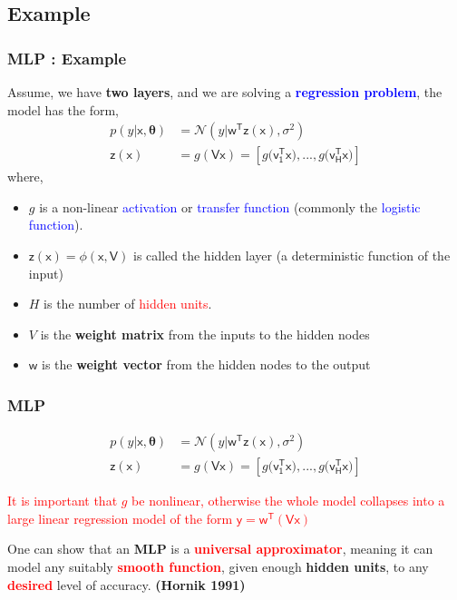 \documentclass{beamer}
\begin{document}
\subsection{Example}
\begin{frame}
    \frametitle{MLP : Example}
	Assume, we have \textbf{two layers}, and we are solving a \textbf{\textcolor{blue}{regression problem}}, the model has the form,
	\begin{align*}
	    p(y|\bm{\mathsf{x},\theta}) &= \mathcal{N}(y|\bm{\mathsf{w^{T}z(x)}},\sigma^{2})\\
	    \bm{\mathsf{z(x)}} &= g(\bm{\mathsf{Vx}}) = [g(\mathsf{v_{1}^{T}x)}, ... ,g(\mathsf{v_{H}^{T}x)}]
	\end{align*}
	where, 
	\begin{itemize}

		\item $g$ is a non-linear \textcolor{blue}{activation} or \textcolor{blue}{transfer function} (commonly the \textcolor{blue}{logistic function}).\\
		\item $\bm{\mathsf{z(x) = \phi(x, V)}}$ is called the hidden layer (a deterministic function of the input)
		\item $H$ is the number of \textcolor{red}{hidden units}.
		\item $V$ is the \textbf{weight matrix} from the inputs to the hidden nodes
		\item $\mathsf{w}$ is the \textbf{weight vector} from the hidden nodes to the output
	\end{itemize}

\end{frame}


	
\begin{frame}
    \frametitle{MLP}
	\begin{align*}
	    p(y|\bm{\mathsf{x},\theta}) &= \mathcal{N}(y|\bm{\mathsf{w^{T}z(x)}},\sigma^{2})\\
	    \bm{\mathsf{z(x)}} &= g(\bm{\mathsf{Vx}}) = [g(\mathsf{v_{1}^{T}x)}, ... ,g(\mathsf{v_{H}^{T}x)}]
	\end{align*}
	\begin{block}{}
		\centering
		\textcolor{red}{It is important that $g$ be nonlinear, otherwise the whole model collapses into a large linear regression model of the form
$\bm{\mathsf{y = w^{T}(Vx)}}$}
	\end{block}
	\begin{block}{}
		One can show that an \textbf{MLP} is a \textbf{\textcolor{red}{universal approximator}}, meaning it can model any suitably \textbf{\textcolor{red}{smooth function}}, given enough \textbf{hidden units}, to any \textbf{\textcolor{red}{desired}} level of accuracy. \textbf{(Hornik 1991)}
	\end{block}
\end{frame}
\end{document}
